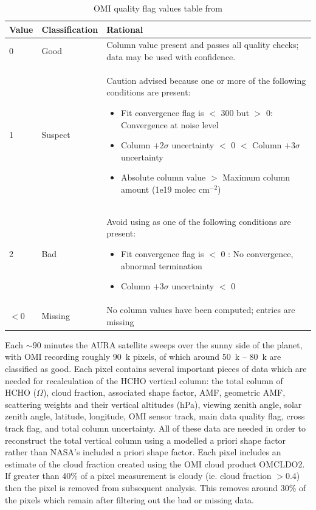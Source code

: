       
      \begin{table}
        \caption{OMI quality flag values table from \textcite{Kurosu2014}}
        \begin{tabular}{  l  l  p{10cm} }
          \hline
          \textbf{Value} & \textbf{Classification} & \textbf{Rational} 
          \\ \hline
          0 & Good & Column value present and passes all quality checks; data may be used with confidence. 
          \\ \hline
          1 & Suspect & Caution advised because one or more of the following conditions are present: 
          \begin{itemize}
            \item Fit convergence flag is $<$ 300 but $>$ 0: Convergence at noise level
            \item Column $+ 2 \sigma$ uncertainty $<$ 0 $<$ Column $ + 3 \sigma $ uncertainty
            \item Absolute column value $>$ Maximum column amount (1e19 molec cm$^{-2}$)
          \end{itemize}
          \\ \hline
          2 & Bad & Avoid using as one of the following conditions are present: 
          \begin{itemize}
            \item Fit convergence flag is $<$ 0 : No convergence, abnormal termination
            \item Column $+ 3 \sigma$ uncertainty $<$ 0
          \end{itemize}
          \\ \hline
          $<0$ & Missing & No column values have been computed; entries are missing
          \\ \hline
        \end{tabular}
        \label{Model:Datasets:OMHCHO:tab_qflag}
      \end{table}
      
      Each $\sim90$ minutes the AURA satellite sweeps over the sunny side of the planet, with OMI recording roughly 90~k pixels, of which around 50~k -- 80~k are classified as good.
      Each pixel contains several important pieces of data which are needed for recalculation of the HCHO vertical column: the total column of HCHO ($\Omega$\moleccm), cloud fraction, associated shape factor, AMF, geometric AMF, scattering weights and their vertical altitudes (hPa), viewing zenith angle, solar zenith angle, latitude, longitude, OMI sensor track, main data quality flag, cross track flag, and total column uncertainty.
      All of these data are needed in order to reconstruct the total vertical column using a modelled a priori shape factor rather than NASA's included a priori shape factor.
      Each pixel includes an estimate of the cloud fraction created using the OMI cloud product OMCLDO2.
      If greater than 40\% of a pixel measurement is cloudy (ie. cloud fraction $>0.4$) then the pixel is removed from subsequent analysis.
      This removes around 30\% of the pixels which remain after filtering out the bad or missing data.

